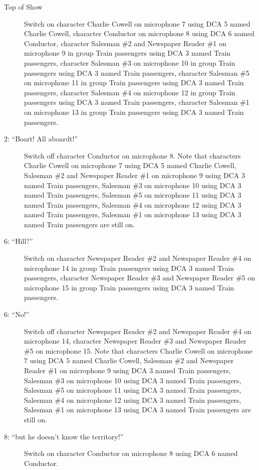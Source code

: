 \begin{description}
\item[Top of Show]
Switch on character Charlie Cowell on microphone 7 using DCA 5 named Charlie Cowell, character Conductor on microphone 8 using DCA 6 named Conductor, character Salesman \#2 and Newspaper Reader \#1 on microphone 9 in group Train passengers using DCA 3 named Train passengers, character Salesman \#3 on microphone 10 in group Train passengers using DCA 3 named Train passengers, character Salesman \#5 on microphone 11 in group Train passengers using DCA 3 named Train passengers, character Salesman \#4 on microphone 12 in group Train passengers using DCA 3 named Train passengers, character Salesman \#1 on microphone 13 in group Train passengers using DCA 3 named Train passengers. 

\item[2: ``Boart!  All aboardt!'']
Switch off character Conductor on microphone 8. Note that characters Charlie Cowell on microphone 7 using DCA 5 named Charlie Cowell, Salesman \#2 and Newspaper Reader \#1 on microphone 9 using DCA 3 named Train passengers, Salesman \#3 on microphone 10 using DCA 3 named Train passengers, Salesman \#5 on microphone 11 using DCA 3 named Train passengers, Salesman \#4 on microphone 12 using DCA 3 named Train passengers, Salesman \#1 on microphone 13 using DCA 3 named Train passengers are still on.  

\item[6: ``Hill?'']
Switch on character Newspaper Reader \#2 and Newspaper Reader \#4 on microphone 14 in group Train passengers using DCA 3 named Train passengers, character Newspaper Reader \#3 and Newspaper Reader \#5 on microphone 15 in group Train passengers using DCA 3 named Train passengers. 

\item[6: ``No!'']
Switch off character Newspaper Reader \#2 and Newspaper Reader \#4 on microphone 14, character Newspaper Reader \#3 and Newspaper Reader \#5 on microphone 15. Note that characters Charlie Cowell on microphone 7 using DCA 5 named Charlie Cowell, Salesman \#2 and Newspaper Reader \#1 on microphone 9 using DCA 3 named Train passengers, Salesman \#3 on microphone 10 using DCA 3 named Train passengers, Salesman \#5 on microphone 11 using DCA 3 named Train passengers, Salesman \#4 on microphone 12 using DCA 3 named Train passengers, Salesman \#1 on microphone 13 using DCA 3 named Train passengers are still on.  

\item[8: ``but he doesn't know the territory!'']
Switch on character Conductor on microphone 8 using DCA 6 named Conductor. 


\end{description}
